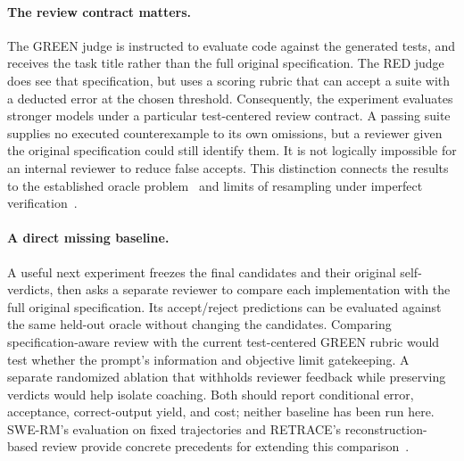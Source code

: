 \documentclass{article}
\begin{document}
\paragraph{The review contract matters.} The GREEN judge is instructed to evaluate code against
the generated tests, and receives the task title rather than the full original specification.
The RED judge does see that specification, but uses a scoring rubric that can accept a suite
with a deducted error at the chosen threshold. Consequently, the experiment evaluates stronger
models under a particular test-centered review contract. A passing suite supplies no executed
counterexample to its own omissions, but a reviewer given the original specification could still
identify them. It is not logically impossible for an internal reviewer to reduce false accepts.
This distinction connects the results to the established oracle problem~\cite{barr2015oracle}
and limits of resampling under imperfect verification~\cite{stroebl2026resampling}.

\paragraph{A direct missing baseline.} A useful next experiment freezes the final candidates
and their original self-verdicts, then asks a separate reviewer to compare each implementation
with the full original specification. Its accept/reject predictions can be evaluated against
the same held-out oracle without changing the candidates. Comparing specification-aware review
with the current test-centered GREEN rubric would test whether the prompt's information and
objective limit gatekeeping. A separate randomized ablation that withholds reviewer feedback
while preserving verdicts would help isolate coaching. Both should report conditional error,
acceptance, correct-output yield, and cost; neither baseline has been run here.
SWE-RM's evaluation on fixed trajectories and RETRACE's reconstruction-based review
provide concrete precedents for extending this comparison~\cite{shum2025swerm,li2026retrace}.
\end{document}
